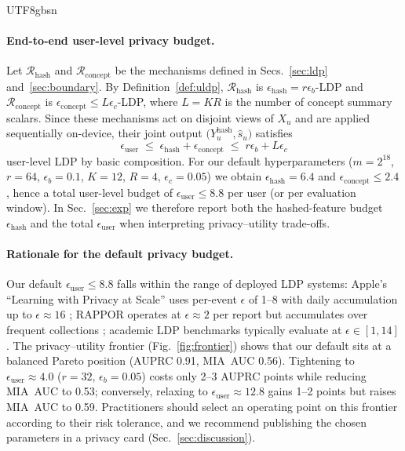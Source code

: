 \documentclass[lettersize,journal]{IEEEtran}
\begin{document}
\begin{CJK*}{UTF8}{gbsn}
\paragraph{End-to-end user-level privacy budget.}
Let $\mathcal{R}_{\text{hash}}$ and $\mathcal{R}_{\text{concept}}$ be the mechanisms defined in Secs.~\ref{sec:ldp} and~\ref{sec:boundary}. By Definition~\ref{def:uldp}, $\mathcal{R}_{\text{hash}}$ is $\epsilon_{\text{hash}}{=}r\epsilon_b$-LDP and $\mathcal{R}_{\text{concept}}$ is $\epsilon_{\text{concept}}{\le}L\epsilon_c$-LDP, where $L{=}K R$ is the number of concept summary scalars. Since these mechanisms act on disjoint views of $X_u$ and are applied sequentially on-device, their joint output $\bigl(Y^{\text{hash}}_u,\hat{s}_u\bigr)$ satisfies
\begin{equation}
  \epsilon_{\text{user}}
  \;\le\; \epsilon_{\text{hash}} + \epsilon_{\text{concept}}
  \;\le\; r\epsilon_b + L\epsilon_c
\end{equation}
user-level LDP by basic composition. For our default hyperparameters ($m{=}2^{18}$, $r{=}64$, $\epsilon_b{=}0.1$, $K{=}12$, $R{=}4$, $\epsilon_c{=}0.05$) we obtain $\epsilon_{\text{hash}}{=}6.4$ and $\epsilon_{\text{concept}}{\le}2.4$, hence a total user-level budget of
$\epsilon_{\text{user}} \le 8.8$ per user (or per evaluation window). In Sec.~\ref{sec:exp} we therefore report both the hashed-feature budget $\epsilon_{\text{hash}}$ and the total $\epsilon_{\text{user}}$ when interpreting privacy--utility trade-offs.

\paragraph{Rationale for the default privacy budget.}
Our default $\epsilon_{\text{user}} \le 8.8$ falls within the range of deployed LDP systems: Apple's ``Learning with Privacy at Scale'' uses per-event $\epsilon$ of 1--8 with daily accumulation up to $\epsilon{\approx}16$ \cite{apple2017privacy}; RAPPOR operates at $\epsilon{\approx}2$ per report but accumulates over frequent collections \cite{erling2014rappor}; academic LDP benchmarks typically evaluate at $\epsilon \in [1, 14]$ \cite{wang2020surveyldp}. The privacy--utility frontier (Fig.~\ref{fig:frontier}) shows that our default sits at a balanced Pareto position (AUPRC 0.91, MIA~AUC 0.56). Tightening to $\epsilon_{\text{user}}{\approx}4.0$ ($r{=}32$, $\epsilon_b{=}0.05$) costs only 2--3 AUPRC points while reducing MIA~AUC to 0.53; conversely, relaxing to $\epsilon_{\text{user}}{\approx}12.8$ gains 1--2 points but raises MIA~AUC to 0.59. Practitioners should select an operating point on this frontier according to their risk tolerance, and we recommend publishing the chosen parameters in a privacy card (Sec.~\ref{sec:discussion}).


\end{CJK*}
\end{document}
